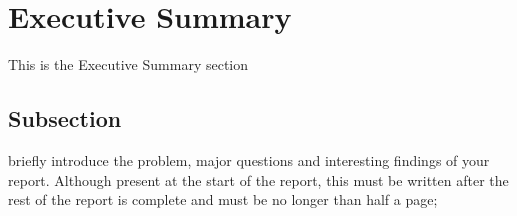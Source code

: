 \section{Executive Summary}\label{Section label}
This is the Executive Summary section
\subsection{Subsection}\label{subsection}
briefly introduce the problem, major questions and interesting findings of your report. Although present at the start of the report, this must be written after the rest of the report is complete and must be no longer than half a page;  